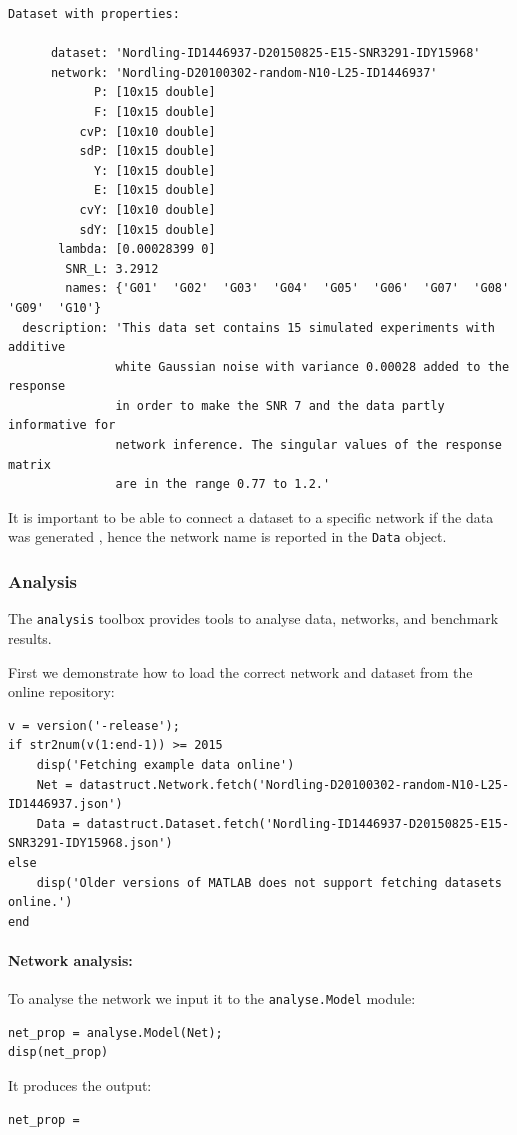 \begin{bibunit}
\begin{verbatim}
Dataset with properties:

      dataset: 'Nordling-ID1446937-D20150825-E15-SNR3291-IDY15968'
      network: 'Nordling-D20100302-random-N10-L25-ID1446937'
            P: [10x15 double]
            F: [10x15 double]
          cvP: [10x10 double]
          sdP: [10x15 double]
            Y: [10x15 double]
            E: [10x15 double]
          cvY: [10x10 double]
          sdY: [10x15 double]
       lambda: [0.00028399 0]
        SNR_L: 3.2912
        names: {'G01'  'G02'  'G03'  'G04'  'G05'  'G06'  'G07'  'G08'  'G09'  'G10'}
  description: 'This data set contains 15 simulated experiments with additive
               white Gaussian noise with variance 0.00028 added to the response
               in order to make the SNR 7 and the data partly informative for
               network inference. The singular values of the response matrix
               are in the range 0.77 to 1.2.'
\end{verbatim}
\noindent
It is important to be able to connect a dataset to a specific network if the data was generated \insilico, hence the network name
is reported in the \texttt{Data} object.

\subsubsection{Analysis}
\label{sec:analysis_toolbox}
The \texttt{analysis} toolbox provides tools to analyse data, networks, and benchmark results.

First we demonstrate how to load the correct network and dataset from the online repository:
\begin{verbatim}
v = version('-release');
if str2num(v(1:end-1)) >= 2015
    disp('Fetching example data online')
    Net = datastruct.Network.fetch('Nordling-D20100302-random-N10-L25-ID1446937.json')
    Data = datastruct.Dataset.fetch('Nordling-ID1446937-D20150825-E15-SNR3291-IDY15968.json')
else
    disp('Older versions of MATLAB does not support fetching datasets online.')
end
\end{verbatim}


\paragraph{Network analysis:}
\label{sec:network_analysis_example}
To analyse the network we input it to the \texttt{analyse.Model} module:
\begin{verbatim}
net_prop = analyse.Model(Net);
disp(net_prop)
\end{verbatim}
It produces the output:
\begin{verbatim}
net_prop =


\end{verbatim}
\end{bibunit}
